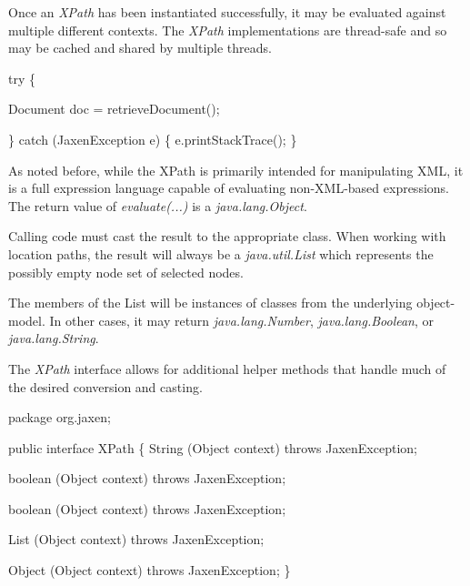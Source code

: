 \documentclass[20pt,landscape,headrule,footrule]{foils}
\begin{document}


Once an \emph{XPath} has been instantiated successfully, it may be
evaluated against multiple different contexts.  The \emph{XPath}
implementations are thread-safe and so may be cached and shared 
by multiple threads.

\begin{codelisting}
try
\{

    Document doc = retrieveDocument();

\}
catch (JaxenException e)
\{
    e.printStackTrace();
\}
\end{codelisting}



As noted before, while the XPath is primarily intended for
manipulating XML, it is a full expression language capable of
evaluating non-XML-based expressions. The return value of
\emph{evaluate(...)} is a \emph{java.lang.Object}.

Calling code must cast the result to the appropriate class.
When working with location paths, the result will always
be a \emph{java.util.List} which represents the possibly
empty node set of selected nodes.

The members of the List will be instances of classes from the
underlying object-model.
In other cases, it may return \emph{java.lang.Number},
\emph{java.lang.Boolean}, or \emph{java.lang.String}.



The \emph{XPath} interface allows for additional helper methods
that handle much of the desired conversion and casting.

\begin{codelisting}
package org.jaxen;

public interface XPath
\{
    String (Object context)
        throws JaxenException;

    boolean (Object context)
        throws JaxenException;

    boolean (Object context)
        throws JaxenException;

    List (Object context)
        throws JaxenException;

    Object (Object context)
        throws JaxenException;
\}
\end{codelisting}
\end{document}
